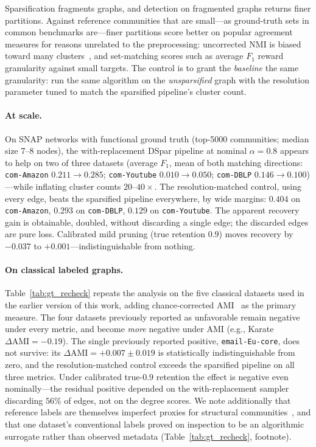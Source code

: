 Sparsification fragments graphs, and detection on fragmented graphs returns finer partitions.
Against reference communities that are small---as ground-truth sets in common benchmarks are---finer partitions score better on popular agreement measures for reasons unrelated to the preprocessing: uncorrected NMI is biased toward many clusters~\cite{vinh2010information}, and set-matching scores such as average $F_1$ reward granularity against small targets.
The control is to grant the \emph{baseline} the same granularity: run the same algorithm on the \emph{unsparsified} graph with the resolution parameter tuned to match the sparsified pipeline's cluster count.

\paragraph{At scale.}
On SNAP networks with functional ground truth (top-5000 communities; median size 7--8 nodes), the with-replacement DSpar pipeline at nominal $\alpha=0.8$ appears to help on two of three datasets (average $F_1$, mean of both matching directions: \texttt{com-Amazon} $0.211 \to 0.285$; \texttt{com-Youtube} $0.010 \to 0.050$; \texttt{com-DBLP} $0.146 \to 0.100$)---while inflating cluster counts $20$--$40\times$.
The resolution-matched control, using every edge, beats the sparsified pipeline everywhere, by wide margins: $0.404$ on \texttt{com-Amazon}, $0.293$ on \texttt{com-DBLP}, $0.129$ on \texttt{com-Youtube}.
The apparent recovery gain is obtainable, doubled, without discarding a single edge; the discarded edges are pure loss.
Calibrated mild pruning (true retention $0.9$) moves recovery by $-0.037$ to $+0.001$---indistinguishable from nothing.

\paragraph{On classical labeled graphs.}

Table~\ref{tab:gt_recheck} repeats the analysis on the five classical datasets used in the earlier version of this work, adding chance-corrected AMI~\cite{vinh2010information} as the primary measure.
The four datasets previously reported as unfavorable remain negative under every metric, and become \emph{more} negative under AMI (e.g., Karate $\Delta\mathrm{AMI} = -0.19$).
The single previously reported positive, \texttt{email-Eu-core}, does not survive: its $\Delta\mathrm{AMI} = +0.007 \pm 0.019$ is statistically indistinguishable from zero, and the resolution-matched control exceeds the sparsified pipeline on all three metrics.
Under calibrated true-$0.9$ retention the effect is negative even nominally---the residual positive depended on the with-replacement sampler discarding $56\%$ of edges, not on the degree scores.
We note additionally that reference labels are themselves imperfect proxies for structural communities~\cite{peel2017ground, hric2014community}, and that one dataset's conventional labels proved on inspection to be an algorithmic surrogate rather than observed metadata (Table~\ref{tab:gt_recheck}, footnote).

